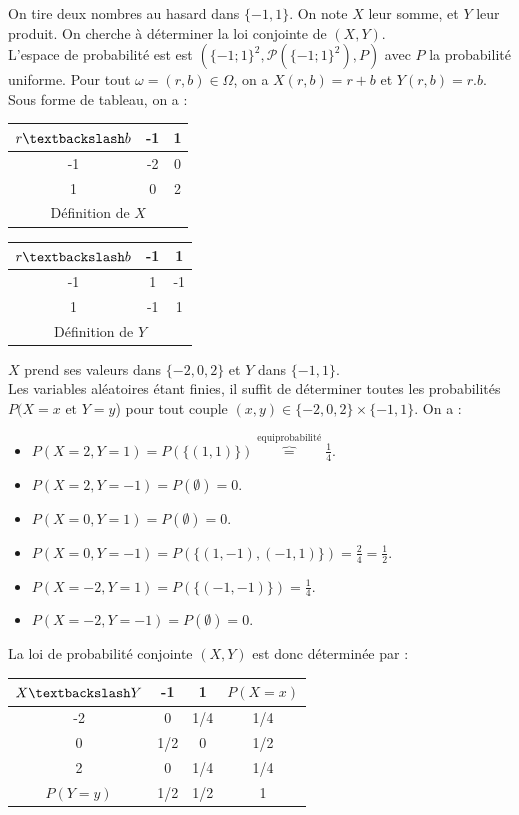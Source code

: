 \documentclass{book}
\begin{document}
\begin{Exemple}
On tire deux nombres au hasard dans $\{-1,1\}$. On note $X$ leur somme, et $Y$ leur produit. On cherche à déterminer la loi conjointe de $(X,Y)$.\\
L'espace de probabilité est  est $(\{-1;1\}^2,\mathcal{P}(\{-1;1\}^2),P)$ avec $P$ la probabilité uniforme. Pour tout $\omega=(r,b)\in\Omega$, on a $X(r,b)=r+b$ et $Y(r,b)=r.b$. Sous forme de tableau, on a :
\begin{center}
\begin{tabular}{|c|c|c|}
\hline
$r\textbackslash b$ & -1& 1 \\\hline
-1 &-2& 0 \\\hline
1 & 0& 2 \\\hline
\multicolumn{3}{c}{Définition de $X$}
\end{tabular}
\end{center}  
 \begin{center}
\begin{tabular}{|c|c|c|}
\hline
$r\textbackslash b$ & -1& 1 \\\hline
-1 &1& -1 \\\hline
1 & -1&1 \\\hline
\multicolumn{3}{c}{Définition de $Y$}
\end{tabular}
\end{center}  
$X$ prend ses valeurs dans $\{-2,0,2\}$ et $Y$ dans $\{-1,1\}$.\\
 Les variables aléatoires étant finies, il suffit de déterminer toutes les probabilités $P(X=x\text{  et }Y=y$) pour tout couple $(x,y)\in \{-2,0,2\}\times\{-1,1\}$. On a :
 \begin{itemize}
 \item $P(X=2, Y=1)=P( \{(1,1)\})\overbrace{=}^{\text{equiprobabilité}} \frac{1}{4}.$
 \item $P(X=2, Y=-1)=P( \emptyset)= 0.$
\item  $P(X=0, Y=1)=P( \emptyset)= 0.$
\item  $P(X=0, Y=-1)=P( \{(1,-1),(-1,1)\})=\frac{2}{4}=\frac 1 2.$
\item $P(X=-2, Y=1)=P( \{(-1,-1)\})=\frac{1}{4}.$
\item $P(X=-2, Y=-1)=P( \emptyset)= 0.$
 \end{itemize}
La loi de probabilité conjointe $(X,Y)$ est donc déterminée par :
\begin{center}
\begin{tabular}{|c|c|c|c|}
\hline
$X\textbackslash Y$ & -1& 1 & $P(X=x)$\\\hline
-2 & 0& 1/4 & 1/4\\\hline
0 & 1/2 &0 & 1/2\\\hline
2 & 0& 1/4 & 1/4\\\hline
$P(Y=y)$&1/2&1/2&1 \\\hline
\end{tabular}
\end{center} 
\end{Exemple}
\end{document}
